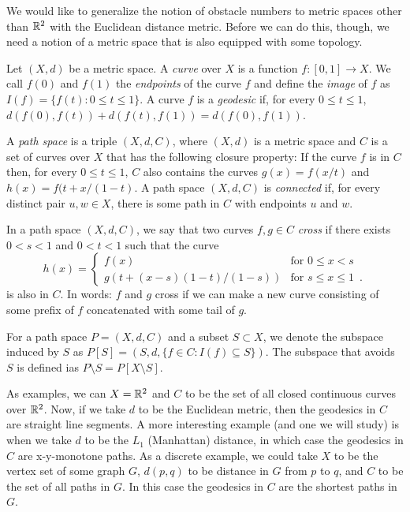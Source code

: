 \documentclass{patmorin}
\begin{document}
We would like to generalize the notion of obstacle numbers to metric
spaces other than $\mathbb{R}^2$ with the Euclidean distance metric.  Before we
can do this, though, we need a notion of a metric space that is also
equipped with some topology.

Let $(X,d)$ be a metric space.  A \emph{curve} over $X$ is a function
$f:[0,1]\to X$.  We call $f(0)$ and $f(1)$ the \emph{endpoints} of the
curve $f$ and define the \emph{image} of $f$ as $I(f)=\{f(t):0\le t\le
1\}$.  A curve $f$ is a \emph{geodesic} if, for every $0\le t\le 1$,
$d(f(0),f(t)) + d(f(t),f(1)) = d(f(0),f(1))$.  


A \emph{path space} is a triple $(X,d,C)$, where $(X,d)$ is a metric
space and $C$ is a set of curves over $X$ that has the following closure
property:  If the curve $f$ is in $C$ then, for every $0\le t\le 1$,
$C$ also contains the curves $g(x)=f(x/t)$ and $h(x)=f(t+x/(1-t)$.
A path space $(X,d,C)$ is \emph{connected} if, for every distinct pair
$u,w\in X$, there is some path in $C$ with endpoints $u$ and $w$.

In a path space $(X,d,C)$, we say that
two curves $f,g\in C$ \emph{cross} if there exists $0<s<1$ and $0<t<1$ such
that the curve
\[
    h(x) = \begin{cases} 
             f(x) & \text{for $0\le x< s$} \\
             g(t+(x-s)(1-t)/(1-s)) & \text{for $s\le x\le 1$} \enspace .
           \end{cases}
\]
is also in $C$. In words: $f$ and $g$ cross if we can make a new curve
consisting of some prefix of $f$ concatenated with some tail of $g$.


For a path space $P=(X,d,C)$ and a subset $S\subset X$, we denote the
subspace induced by $S$ as $P[S]=(S,d,\{f\in C:I(f)\subseteq S\})$.  The
subspace that avoids $S$ is defined ias $P\setminus S = P[X\setminus S]$.

As examples, we can $X=\mathbb{R}^2$ and $C$ to be the set of all closed
continuous curves over $\mathbb{R}^2$.  Now, if we take $d$ to be the Euclidean
metric, then the geodesics in $C$ are straight line segments.  A more
interesting example (and one we will study) is when we take $d$ to be
the $L_1$ (Manhattan) distance, in which case the geodesics in $C$ are
x-y-monotone paths.  As a discrete example, we could take $X$ to be the
vertex set of some graph $G$, $d(p,q)$ to be distance in $G$ from $p$
to $q$, and $C$ to be the set of all paths in $G$. In this case the
geodesics in $C$ are the shortest paths in $G$.
\end{document}
